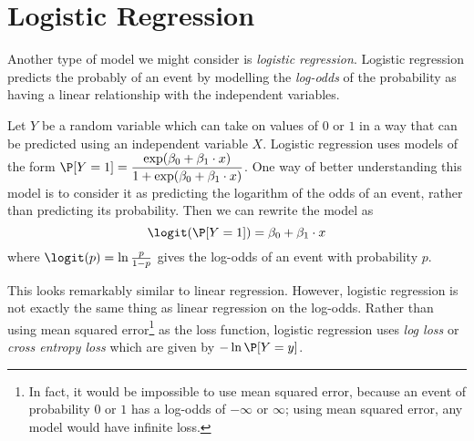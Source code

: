 \section{Logistic Regression}
Another type of model we might consider is \textit{logistic regression}. Logistic regression predicts the probably of an event by modelling the \textit{log-odds} of the probability as having a linear relationship with the independent variables. 

Let $Y$ be a random variable which can take on values of $0$ or $1$ in a way that can be predicted using an independent variable $X$. Logistic regression uses models of the form $\P[Y=1] = \dfrac{\exp(\beta_0 + \beta_1 \cdot x)}{1+\exp(\beta_0+\beta_1\cdot x)}$. One way of better understanding this model is to consider it as predicting the logarithm of the odds of an event, rather than predicting its probability. Then we can rewrite the model as \begin{equation}
    \logit(\P[Y = 1]) = \beta_0 + \beta_1 \cdot x
\end{equation}
where $\logit(p) = \ln \frac{p}{1-p}$ gives the log-odds of an event with probability $p$.

This looks remarkably similar to linear regression. However, logistic regression is not exactly the same thing as linear regression on the log-odds. Rather than using mean squared error\footnote{In fact, it would be impossible to use mean squared error, because an event of probability $0$ or $1$ has a log-odds of $-\infty$ or $\infty$; using mean squared error, any model would have infinite loss.} as the loss function, logistic regression uses \textit{log loss} or \textit{cross entropy loss} which are given by $-\ln \P[Y=y]$. 

